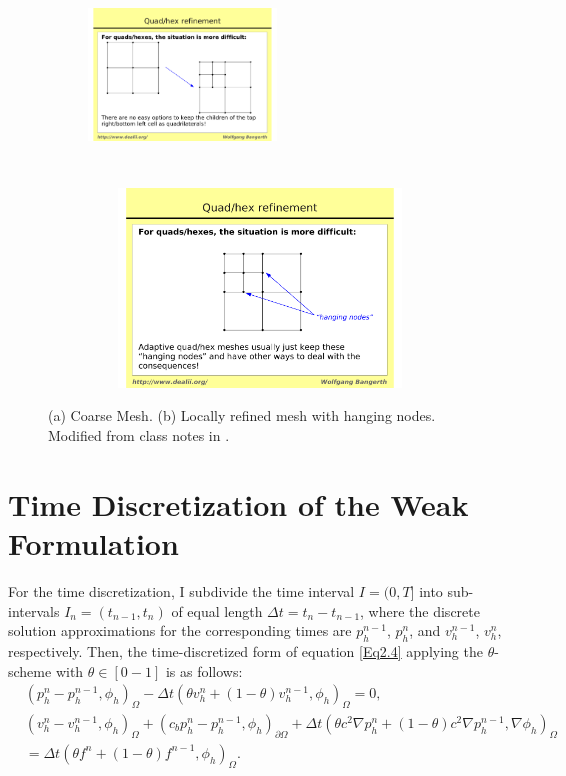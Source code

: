 \begin{figure}[h!]
 		\centering
		\begin{subfigure}{5 cm}
				\includegraphics[width=5cm, height=5cm]{figures/coarse_mesh.pdf} 
			     \caption{}
		\end{subfigure}
        \qquad
		\begin{subfigure}{10 cm}
				\includegraphics[width=9.2cm, height=5.3cm]{figures/mesh_hanging_nodes.pdf}
			   \caption{}
		\end{subfigure}
 
	\caption{(a) Coarse Mesh. (b) Locally refined mesh with hanging nodes. Modified from class notes in \cite{Bangerth2013}. }
	\label{fig:2.1}
\end{figure}

\section{Time Discretization of the Weak Formulation}
For the time discretization, I subdivide  the time interval $I=(0,T]$ into sub-intervals $I_n=(t_{n-1}, t_n)$  of equal length $\Delta t =t_n-t_{n-1}$, where the discrete solution approximations for the corresponding times are $p_h^{n-1}$, $p_h^n$, and  $v_h^{n-1}$, $v_h^n$, respectively. Then, the time-discretized form of equation \ref{Eq2.4} applying the $\theta$-scheme with $\theta \in [0-1]$ is as follows:
 \begin{equation} \label{Eq2.10}
 \begin{split}
   & \left( p_h^n - p_h^{n-1},\phi_h \right)_\Omega -  \Delta t \left( \theta v_h^n + (1-\theta) v_h^{n-1}, \phi_h \right)_\Omega    =0,\\
   & \left( v_h^n-v_h^{n-1}, \phi_h \right)_\Omega  + \left(  c_b p_h^n - p_h^{n-1}, \phi_h  \right)_{\partial \Omega} + \Delta t \left( \theta c^2 \nabla p_h^n  + (1-\theta) c^2 \nabla p_h^{n-1}, \nabla \phi_h  \right)_\Omega\\
    &= \Delta t \left( \theta f^n +(1-\theta)f^{n-1}, \phi_h \right)_\Omega .
 \end{split}
 \end{equation}


